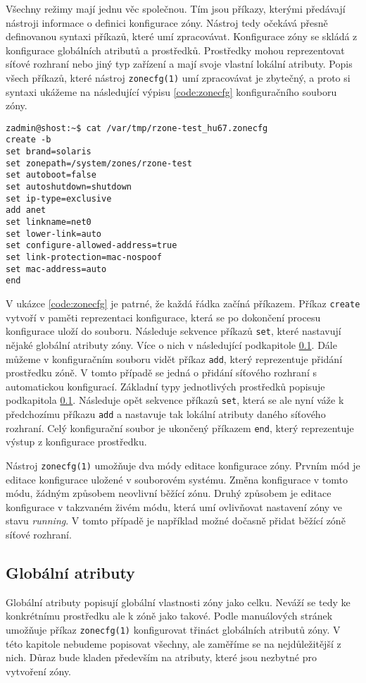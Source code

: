 Všechny režimy mají jednu věc společnou. Tím jsou příkazy, kterými předávají nástroji informace o definici konfigurace zóny.
Nástroj tedy očekává přesně definovanou syntaxi příkazů, které umí zpracovávat. Konfigurace zóny se skládá z konfigurace 
globálních atributů a prostředků. Prostředky mohou reprezentovat síťové rozhraní nebo jiný typ zařízení a mají svoje vlastní
lokální atributy. Popis všech příkazů, které nástroj \verb|zonecfg(1)| umí zpracovávat je zbytečný, a proto si syntaxi
ukážeme na následující výpisu \ref{code:zonecfg} konfiguračního souboru zóny.
\begin{lstlisting}[caption={Ukázka konfigurace zóny}, float, label={code:zonecfg}]
zadmin@shost:~$ cat /var/tmp/rzone-test_hu67.zonecfg
create -b
set brand=solaris
set zonepath=/system/zones/rzone-test
set autoboot=false
set autoshutdown=shutdown
set ip-type=exclusive
add anet
set linkname=net0
set lower-link=auto
set configure-allowed-address=true
set link-protection=mac-nospoof
set mac-address=auto
end
\end{lstlisting}
V ukázce \ref{code:zonecfg} je patrné, že každá řádka začíná příkazem. Příkaz \verb|create| vytvoří v paměti reprezentaci
konfigurace, která se po dokončení procesu konfigurace uloží do souboru. Následuje sekvence příkazů \verb|set|, které nastavují
nějaké globální atributy zóny. Více o nich v následující podkapitole \ref{chapter:zones:configuration:global_attributes}. Dále
můžeme v konfiguračním souboru vidět příkaz \verb|add|, který reprezentuje přidání prostředku zóně. V tomto případě se jedná
o přidání síťového rozhraní s automatickou konfigurací. Základní typy jednotlivých prostředků popisuje podkapitola 
\ref{chapter:zones:configuration:global_attributes}. Následuje opět sekvence příkazů \verb|set|, která se ale nyní váže
k předchozímu příkazu \verb|add| a nastavuje tak lokální atributy daného síťového rozhraní. Celý konfigurační soubor je ukončený
příkazem \verb|end|, který reprezentuje výstup z konfigurace prostředku.

Nástroj \verb|zonecfg(1)| umožňuje dva módy editace konfigurace zóny. Prvním mód je editace konfigurace uložené v souborovém
systému. Změna konfigurace v tomto módu, žádným způsobem neovlivní běžící zónu. Druhý způsobem je editace konfigurace v takzvaném
živém módu, která umí ovlivňovat nastavení zóny ve stavu \textit{running}. V tomto případě je například možné dočasně přidat
běžící zóně síťové rozhraní.
\subsection{Globální atributy}
\label{chapter:zones:configuration:global_attributes}
Globální atributy popisují globální vlastnosti zóny jako celku. Neváží se tedy ke konkrétnímu prostředku ale k zóně jako takové.
Podle manuálových stránek \cite{oracle:manpages:zonecfg} umožňuje příkaz \verb|zonecfg(1)| konfigurovat třináct globálních
atributů zóny. V této kapitole nebudeme popisovat všechny, ale zaměříme se na nejdůležitější z nich. Důraz bude kladen především
na atributy, které jsou nezbytné pro vytvoření zóny.
